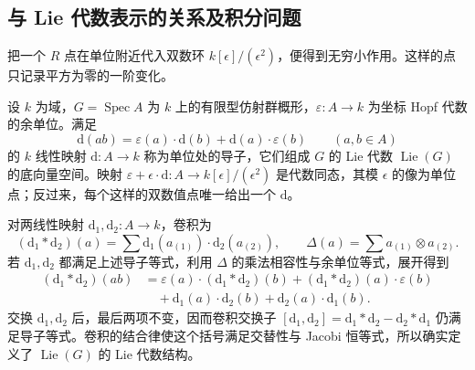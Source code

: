 \subsection{与 Lie 代数表示的关系及积分问题}
\label{b5:subsec:2103:03}

把一个 \(R\) 点在单位附近代入双数环 \(k[\epsilon]/(\epsilon^2)\)，便得到无穷小作用。这样的点只记录平方为零的一阶变化。
\begin{definition}\label{b5:def:group-scheme-lie-algebra}
	设 \(k\) 为域，\(G=\operatorname{Spec}A\) 为 \(k\) 上的有限型仿射群概形，\(\varepsilon:A\to k\) 为坐标 Hopf 代数的余单位。满足
	\[
		\mathrm{d}(ab)=\varepsilon(a)\cdot\mathrm{d}(b)+\mathrm{d}(a)\cdot\varepsilon(b) \qquad(a,b\in A)
	\]
	的 \(k\) 线性映射 \(\mathrm{d}:A\to k\) 称为单位处的导子，它们组成 \(G\) 的 Lie 代数 \(\operatorname{Lie}(G)\) 的底向量空间。映射 \(\varepsilon+\epsilon\cdot\mathrm{d}:A\to k[\epsilon]/(\epsilon^2)\) 是代数同态，其模 \(\epsilon\) 的像为单位点；反过来，每个这样的双数值点唯一给出一个 \(\mathrm{d}\)。
\end{definition}
对两线性映射 \(\mathrm{d}_1,\mathrm{d}_2:A\to k\)，卷积为
\[
	(\mathrm{d}_1*\mathrm{d}_2)(a)=\sum \mathrm{d}_1(a_{(1)})\cdot\mathrm{d}_2(a_{(2)}), \qquad \Delta(a)=\sum a_{(1)}\otimes a_{(2)}.
\]
若 \(\mathrm{d}_1,\mathrm{d}_2\) 都满足上述导子等式，利用 \(\Delta\) 的乘法相容性与余单位等式，展开得到
\[
	\begin{aligned}
		(\mathrm{d}_1*\mathrm{d}_2)(ab) &=\varepsilon(a)\cdot(\mathrm{d}_1*\mathrm{d}_2)(b)+(\mathrm{d}_1*\mathrm{d}_2)(a)\cdot\varepsilon(b)\\
		&\quad+\mathrm{d}_1(a)\cdot\mathrm{d}_2(b)+\mathrm{d}_2(a)\cdot\mathrm{d}_1(b).
	\end{aligned}
\]
交换 \(\mathrm{d}_1,\mathrm{d}_2\) 后，最后两项不变，因而卷积交换子 \([\mathrm{d}_1,\mathrm{d}_2]=\mathrm{d}_1*\mathrm{d}_2-\mathrm{d}_2*\mathrm{d}_1\) 仍满足导子等式。卷积的结合律使这个括号满足交替性与 Jacobi 恒等式，所以确实定义了 \(\operatorname{Lie}(G)\) 的 Lie 代数结构。


